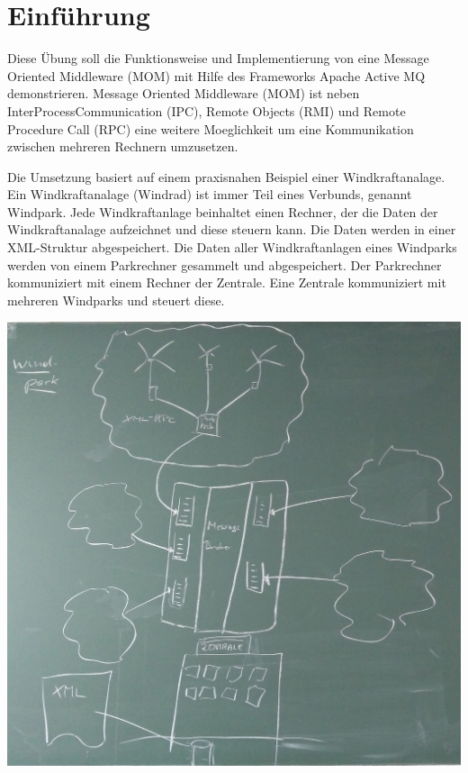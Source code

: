 
\section{Einführung}

Diese Übung soll die Funktionsweise und Implementierung von eine Message Oriented Middleware (MOM) mit Hilfe des Frameworks Apache Active MQ demonstrieren. Message Oriented Middleware (MOM) ist neben InterProcessCommunication (IPC), Remote Objects (RMI) und Remote Procedure Call (RPC) eine weitere Moeglichkeit um eine Kommunikation zwischen mehreren Rechnern umzusetzen.

Die Umsetzung basiert auf einem praxisnahen Beispiel einer Windkraftanalage. Ein Windkraftanalage (Windrad) ist immer Teil eines Verbunds, genannt Windpark. Jede Windkraftanlage beinhaltet einen Rechner, der die Daten der Windkraftanalage aufzeichnet und diese steuern kann. Die Daten werden in einer XML-Struktur abgespeichert. Die Daten aller Windkraftanlagen eines Windparks werden von einem Parkrechner gesammelt und abgespeichert. Der Parkrechner kommuniziert mit einem Rechner der Zentrale. Eine Zentrale kommuniziert mit mehreren Windparks und steuert diese.

\includegraphics[scale=0.4]{images/windpark_grafik.jpg}

